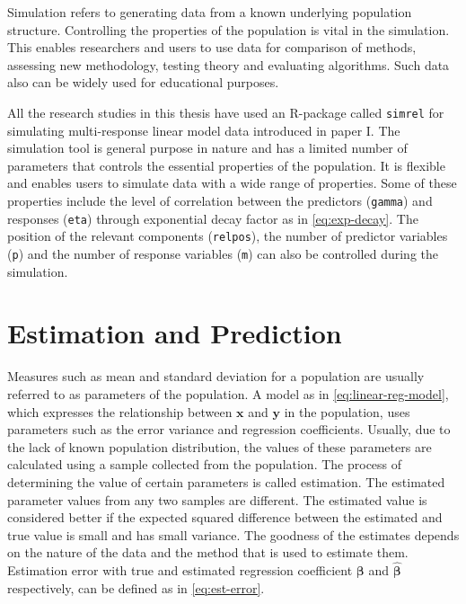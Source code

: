 \documentclass[11pt,twoside,openright,titlepage,
  headinclude,footinclude,BCOR=5mm,
  numbers=noenddot,cleardoublepage=empty,
  tablecaptionabove, dottedtoc,
  bibliography=totoc,paper=a4]{scrreprt}
\begin{document}
Simulation refers to generating data from a known underlying population structure. Controlling the properties of the population is vital in the simulation. This enables researchers and users to use data for comparison of methods, assessing new methodology, testing theory and evaluating algorithms. Such data also can be widely used for educational purposes.

All the research studies in this thesis have used an R-package called \texttt{simrel} for simulating multi-response linear model data introduced in paper I. The simulation tool is general purpose in nature and has a limited number of parameters that controls the essential properties of the population. It is flexible and enables users to simulate data with a wide range of properties. Some of these properties include the level of correlation between the predictors (\texttt{gamma}) and responses (\texttt{eta}) through exponential decay factor as in \eqref{eq:exp-decay}. The position of the relevant components (\texttt{relpos}), the number of predictor variables (\texttt{p}) and the number of response variables (\texttt{m}) can also be controlled during the simulation.

\hypertarget{estimation-and-prediction}{%
\section{Estimation and Prediction}\label{estimation-and-prediction}}

Measures such as mean and standard deviation for a population are usually referred to as parameters of the population. A model as in \eqref{eq:linear-reg-model}, which expresses the relationship between \(\mathbf{x}\) and \(\mathbf{y}\) in the population, uses parameters such as the error variance and regression coefficients. Usually, due to the lack of known population distribution, the values of these parameters are calculated using a sample collected from the population. The process of determining the value of certain parameters is called estimation. The estimated parameter values from any two samples are different. The estimated value is considered better if the expected squared difference between the estimated and true value is small and has small variance. The goodness of the estimates depends on the nature of the data and the method that is used to estimate them. Estimation error with true and estimated regression coefficient \(\boldsymbol{\beta}\) and \(\boldsymbol{\widehat{\beta}}\) respectively, can be defined as in \eqref{eq:est-error}.
\end{document}
